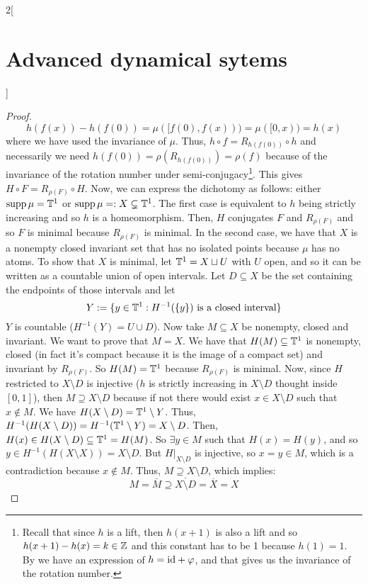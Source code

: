\documentclass[../../../main_math.tex]{subfiles}
\begin{document}
\begin{multicols}{2}[\section{Advanced dynamical sytems}]
\begin{proof}
    $$
      h(f(x))-h(f(0))=\mu([f(0),f(x)))=\mu([0,x))=h(x)
    $$
    where we have used the invariance of $\mu$. Thus, $h\circ f=R_{h(f(0))}\circ h$ and necessarily we need $h(f(0))=\rho(R_{h(f(0))})=\rho(f)$ because of the invariance of the rotation number under semi-conjugacy\footnote{Recall that since $h$ is a lift, then $h(x+1)$ is also a lift and so $h(x+1)-h(x)=k\in\mathbb{Z}$ and this constant has to be 1 because $h(1)=1$. By  we have an expression of $h=\mathrm{id}+\varphi$, and that gives us the invariance of the rotation number.}. This gives $H\circ F=R_{\rho(F)}\circ H$. Now, we can express the dichotomy as follows: either $\operatorname{supp}\mu=\mathbb{T}^1$ or $\operatorname{supp}\mu=:X\subsetneq \mathbb{T}^1$. The first case is equivalent to $h$ being strictly increasing and so $h$ is a homeomorphism. Then, $H$ conjugates $F$ and $R_{\rho(F)}$ and so $F$ is minimal because $R_{\rho(F)}$ is minimal. In the second case, we have that $X$ is a nonempty closed invariant set that has no isolated points because $\mu$ has no atoms. To show that $X$ is minimal, let $\mathbb{T}^1=X\sqcup U$ with $U$ open, and so it can be written as a countable union of open intervals. Let $D\subseteq X$ be the set containing the endpoints of those intervals and let
    \begin{equation}\label{ADS:eq1}
      Y:=\{y\in\mathbb{T}^1:H^{-1}(\{y\})\text{ is a closed interval}\}
    \end{equation}
    $Y$ is countable ($H^{-1}(Y)=U\cup D$). Now take $M\subseteq X$ be nonempty, closed and invariant. We want to prove that $M=X$. We have that $H(M)\subseteq \mathbb{T}^1$ is nonempty, closed (in fact it's compact because it is the image of a compact set) and invariant by $R_{\rho(F)}$. So $H(M)=\mathbb{T}^1$ because $R_{\rho(F)}$ is minimal. Now, since $H$ restricted to $X\setminus D$ is injective ($h$ is strictly increasing in $X\setminus D$ thought inside $[0,1]$), then $M\supseteq X\setminus D$ because if not there would exist $x\in X\setminus D$ such that $x\notin M$. We have $H(X\setminus D)=\mathbb{T}^1\setminus Y$. Thus, $H^{-1}(H(X\setminus D))=H^{-1}(\mathbb{T}^1\setminus Y)=X\setminus D$. Then, $H(x)\in H(X\setminus D)\subseteq \mathbb{T}^1=H(M)$. So $\exists y\in M$ such that $H(x)=H(y)$, and so $y\in H^{-1}(H(X\setminus X))=X\setminus D$. But $H|_{X\setminus D}$ is injective, so $x=y\in M$, which is a contradiction because $x\notin M$. Thus, $M\supseteq X\setminus D$, which implies:
    $$
      M=\overline{M}\supseteq \overline{X\setminus D}=\overline{X} = X
    $$

\end{proof}
\end{multicols}
\end{document}
